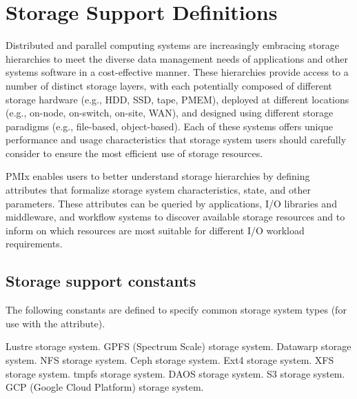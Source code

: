 \chapter{Storage Support Definitions}
\label{chap:api_storage}

Distributed and parallel computing systems are increasingly embracing storage hierarchies to meet the diverse data management needs of applications and other systems software in a cost-effective manner.
These hierarchies provide access to a number of distinct storage layers, with each potentially composed of different storage hardware (e.g., HDD, SSD, tape, PMEM), deployed at different locations (e.g., on-node, on-switch, on-site, WAN), and designed using different storage paradigms (e.g., file-based, object-based).
Each of these systems offers unique performance and usage characteristics that storage system users should carefully consider to ensure the most efficient use of storage resources.

PMIx enables users to better understand storage hierarchies by defining attributes that formalize storage system characteristics, state, and other parameters.
These attributes can be queried by applications, I/O libraries and middleware, and workflow systems to discover available storage resources and to inform on which resources are most suitable for different I/O workload requirements.

\section{Storage support constants}

The following constants are defined to specify common storage system types (for use with the  attribute).

\begin{constantdesc}
%
Lustre storage system.
%
GPFS (Spectrum Scale) storage system.
%
Datawarp storage system.
%
NFS storage system.
%
Ceph storage system.
%
Ext4 storage system.
%
XFS storage system.
%
tmpfs storage system.
%
DAOS storage system.
%
S3 storage system.
%
GCP (Google Cloud Platform) storage system.
%
\end{constantdesc}


